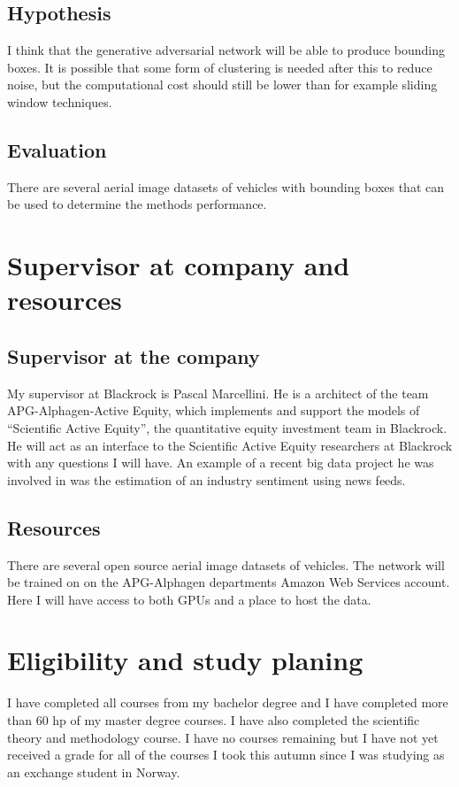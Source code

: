 \documentclass[a4paper,11pt]{article}
\begin{document}
\subsection{Hypothesis} I think that the generative adversarial network will be able to produce bounding boxes. It is possible that some form of clustering is needed after this to reduce noise, but the computational cost should still be lower than for example sliding window techniques.
\subsection{Evaluation} 
There are several aerial image datasets of vehicles with bounding boxes that can be used to determine the methods performance.
\section{Supervisor at company and resources}
\subsection{Supervisor at the company}
My supervisor at Blackrock is Pascal Marcellini. He is a architect of the team APG-Alphagen-Active Equity, which implements and support the models of “Scientific Active Equity”, the quantitative equity investment team in Blackrock. He will act as an interface to the Scientific Active Equity researchers at Blackrock with any questions I will have. An example of a recent big data project he was involved in was the estimation of an industry sentiment using news feeds.
\subsection*{Resources}
There are several open source aerial image datasets of vehicles. The network will be trained on on the APG-Alphagen departments Amazon Web Services account. Here I will have access to both GPUs and a place to host the data. 
\section{Eligibility and study planing}
I have completed all courses from my bachelor degree and I have completed more than 60 hp of my master degree courses. I have also completed the scientific theory and methodology course. I have no courses remaining but I have not yet received a grade for all of the courses I took this autumn since I was studying as an exchange student in Norway.
\end{document}
